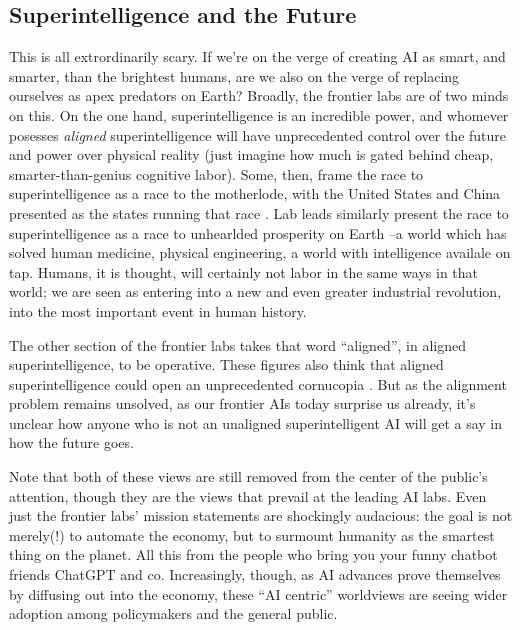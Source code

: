 \subsection{Superintelligence and the Future}
This is all extrordinarily scary. If we're on the verge of creating AI as
smart, and smarter, than the brightest humans, are we also on the verge of
replacing ourselves as apex predators on Earth? Broadly, the frontier labs are
of two minds on this. On the one hand, superintelligence is an incredible
power, and whomever posesses \emph{aligned} superintelligence will have
unprecedented control over the future and power over physical reality (just
imagine how much is gated behind cheap, smarter-than-genius cognitive labor).
Some, then, frame the race to superintelligence as a race to the motherlode,
with the United States and China presented as the states running that race
\cite{aschenbrenner2024situational}. Lab leads similarly present the race to
superintelligence as a race to unhearlded prosperity on Earth
\cite{altman2024intelligence,amodei2024grace}--a world which has solved human
medicine, physical engineering, a world with intelligence availale on tap.
Humans, it is thought, will certainly not labor in the same ways in that world;
we are seen as entering into a new and even greater industrial revolution, into
the most important event in human history.

The other section of the frontier labs takes that word ``aligned'', in aligned
superintelligence, to be operative. These figures also think that aligned
superintelligence could open an unprecedented cornucopia
\cite{bostrom2024utopia}. But as the alignment problem remains unsolved, as our
frontier AIs today surprise us already, it's unclear how anyone who is not an
unaligned superintelligent AI will get a say in how the future goes.

Note that both of these views are still removed from the center of the public's
attention, though they are the views that prevail at the leading AI labs. Even
just the frontier labs' mission statements are shockingly audacious: the goal
is not merely(!) to automate the economy, but to surmount humanity as the
smartest thing on the planet. All this from the people who bring you your funny
chatbot friends ChatGPT and co. Increasingly, though, as AI advances prove
themselves by diffusing out into the economy, these ``AI centric'' worldviews
are seeing wider adoption among policymakers and the general public.

